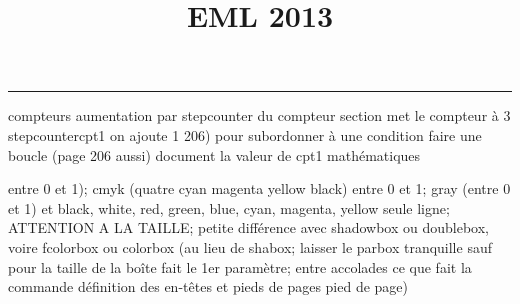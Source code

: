 \documentclass[11pt]{article}%
\title{\bf \vspace{-2cm} EML 2013} %
\author{} %
\date{} %
\renewcommand{\headrulewidth}{0pt}%
\renewcommand{\footrulewidth}{0.4pt}%
\begin{document}
\maketitle %
\vspace{-1.4cm}\hrule %
\thispagestyle{fancy}

\vspace*{.2cm}



compteurs%
aumentation par stepcounter du compteur section%
met le compteur à 3%
stepcounter{cpt1} on ajoute 1%
206) pour subordonner à une condition %
faire une boucle (page 206 aussi) %
document la valeur de cpt1 
mathématiques\newcommand{\ch}{\operatorname{ch}} 
\newcommand{\sh}{\operatorname{sh}}
\renewcommand{\tanh}{\operatorname{th}}
\renewcommand{\sinh}{\operatorname{sh}}
\renewcommand{\cosh}{\operatorname{ch}}
\newcommand{\argsh}{\operatorname{argsh}}
\newcommand{\argch}{\operatorname{argch}}
\newcommand{\argth}{\operatorname{argth}}
\newcommand{\ker}{\operatorname{Ker}}
\renewcommand{\im}{\operatorname{Im}}
\newcommand{\rg}{\operatorname{rg}}
\newcommand{\Id}{\operatorname{Id}}
\newcommand{\id}{\operatorname{id}}
\renewcommand{\leq}{\leq}
\renewcommand{\geq}{\geq }

entre 0 et 1); cmyk (quatre cyan magenta yellow black) entre 0 et 1;
gray (entre 0 et 1) et black, white, red, green, blue, cyan, magenta,
yellow%
seule ligne; ATTENTION A LA TAILLE; petite différence avec shadowbox ou
doublebox, voire fcolorbox ou colorbox (au lieu de shabox; laisser le
parbox tranquille sauf pour la taille de la boîte
\newcommand{\Tbox}[1]{\begin{center} \shabox{\parbox{0.6
\linewidth}{#1}} \end{center}} %
fait le 1er paramètre; entre accolades ce que fait la commande
définition des en-têtes et pieds de pages\pagestyle{fancy}
\chead{}
\rfoot[ \ \thepage]{\thepage}
\cfoot{}
\lfoot{}
\thispagestyle{fancy} %
pied de page)\renewcommand{\footrulewidth}{0.4pt}
\renewcommand{\headrulewidth}{0.4pt}
\end{document}
